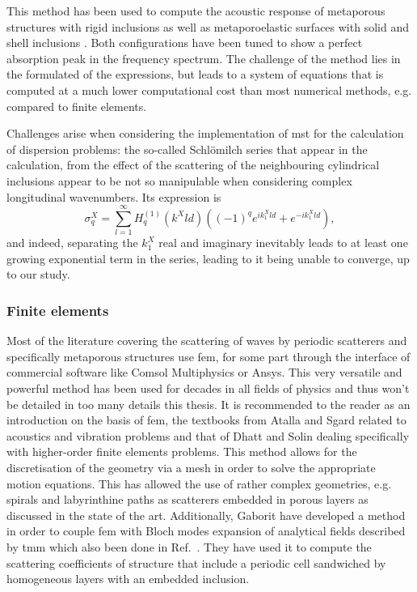 This method has been used to compute the acoustic response of metaporous structures with rigid inclusions \cite{groby2011} as well as metaporoelastic surfaces with solid and shell inclusions \cite{weisser2016}. Both configurations have been tuned to show a perfect absorption peak in the frequency spectrum. The challenge of the method lies in the formulated of the expressions, but leads to a system of equations that is computed at a much lower computational cost than most numerical methods, e.g. compared to finite elements.

Challenges arise when considering the implementation of \acrshort{mst} for the calculation of dispersion problems: the so-called Schlömilch series that appear in the calculation, from the effect of the scattering of the neighbouring cylindrical inclusions appear to be not so manipulable when considering complex longitudinal wavenumbers. Its expression is  
\begin{equation}
    \sigma_q^X=\sum_{l=1}^\infty H_q^{(1)}(k^Xld)\left((-1)^qe^{ik_1^Xld}+e^{-ik_1^Xld}\right),
\end{equation}
and indeed, separating the $k_1^X$ real and imaginary inevitably leads to at least one growing exponential term in the series, leading to it being unable to converge, up to our study. 

\subsubsection{Finite elements}
Most of the literature covering the scattering of waves by periodic scatterers and specifically metaporous structures use \acrshort{fem}, for some part through the interface of commercial software like Comsol Multiphysics or Ansys. This very versatile and powerful method has been used for decades in all fields of physics and thus won't be detailed in too many details this thesis. It is recommended to the reader as an introduction on the basis of \acrshort{fem}, the textbooks from {Atalla} and {Sgard}\cite{atalla2015} related to acoustics and vibration problems and that of Dhatt \etal \cite{dhatt2005} and Solin \etal \cite{solin2004} dealing specifically with higher-order finite elements problems. This method allows for the discretisation of the geometry via a mesh in order to solve the appropriate motion equations. This has allowed the use of rather complex geometries, e.g. spirals \cite{zhong2019} and labyrinthine paths \cite{liu2021} as scatterers embedded in porous layers as discussed in the state of the art. Additionally, Gaborit \etal \cite{gaborit2018} have developed a method in order to couple \acrshort{fem} with Bloch modes expansion of analytical fields described by \acrshort{tmm} which also been done in Ref.~\cite{chevillotte2011}. They have used it to compute the scattering coefficients of structure that include a periodic cell sandwiched by homogeneous layers with an embedded inclusion.\\

